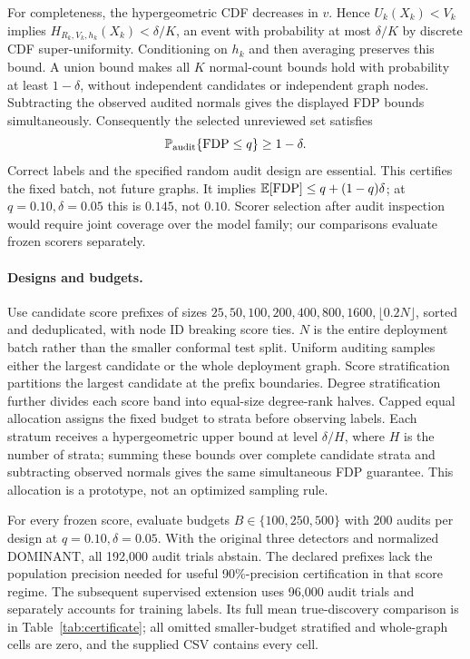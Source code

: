 For completeness, the hypergeometric CDF decreases in $v$. Hence $U_k(X_k)<V_k$ implies $H_{R_k,V_k,h_k}(X_k)<\delta/K$, an event with probability at most $\delta/K$ by discrete CDF super-uniformity. Conditioning on $h_k$ and then averaging preserves this bound. A union bound makes all $K$ normal-count bounds hold with probability at least $1-\delta$, without independent candidates or independent graph nodes. Subtracting the observed audited normals gives the displayed FDP bounds simultaneously. Consequently the selected unreviewed set satisfies
\[
 \mathbb{P}_{\rm audit}\{\operatorname{FDP}\le q\}\ge1-\delta.
\]
Correct labels and the specified random audit design are essential. This certifies the fixed batch, not future graphs. It implies $\mathbb{E}[\operatorname{FDP}]\le q+(1-q)\delta$; at $q=0.10,\delta=0.05$ this is $0.145$, not $0.10$. Scorer selection after audit inspection would require joint coverage over the model family; our comparisons evaluate frozen scorers separately.

\paragraph{Designs and budgets.}
Use candidate score prefixes of sizes $25,50,100,200,400,800,1600,\lfloor0.2N\rfloor$, sorted and deduplicated, with node ID breaking score ties. $N$ is the entire deployment batch rather than the smaller conformal test split. Uniform auditing samples either the largest candidate or the whole deployment graph. Score stratification partitions the largest candidate at the prefix boundaries. Degree stratification further divides each score band into equal-size degree-rank halves. Capped equal allocation assigns the fixed budget to strata before observing labels. Each stratum receives a hypergeometric upper bound at level $\delta/H$, where $H$ is the number of strata; summing these bounds over complete candidate strata and subtracting observed normals gives the same simultaneous FDP guarantee. This allocation is a prototype, not an optimized sampling rule.

For every frozen score, evaluate budgets $B\in\{100,250,500\}$ with 200 audits per design at $q=0.10,\delta=0.05$. With the original three detectors and normalized DOMINANT, all 192,000 audit trials abstain. The declared prefixes lack the population precision needed for useful 90\%-precision certification in that score regime. The subsequent supervised extension uses 96,000 audit trials and separately accounts for training labels. Its full mean true-discovery comparison is in Table~\ref{tab:certificate}; all omitted smaller-budget stratified and whole-graph cells are zero, and the supplied CSV contains every cell.

